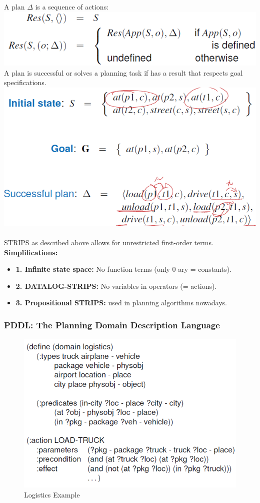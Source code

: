 \documentclass{article}
\begin{document}
A plan $\Delta$ is a sequence of actions:\\
\includegraphics[scale=0.6]{52.png}\\
A plan is successful or solves a planning task if has a result that respects goal specifications.\\
\includegraphics[scale=0.6]{53.png}\\\\
STRIPS as described above allows for unrestricted first-order terms.\\
\textbf{Simplifications: }
\begin{itemize}
\item \textbf{1. Infinite state space: }No function terms (only 0-ary = constants).
\item \textbf{2. DATALOG-STRIPS: }No variables in operators (= actions).
\item \textbf{3. Propositional STRIPS: }used in planning algorithms nowadays.
\end{itemize}
\subsubsection{PDDL: The Planning Domain Description Language}
\begin{figure}
\includegraphics[scale=0.6]{54.png}
\caption{Logistics Example}
\end{figure}
\end{document}
